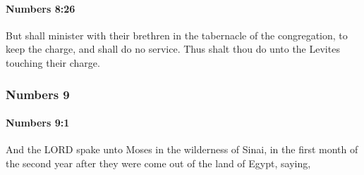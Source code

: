 		\paragraph{Numbers 8:26} %
			\label{NUMBERS-8-26}

			But shall minister with their brethren in the tabernacle of the congregation, to keep the charge, and shall do no service. Thus shalt thou do unto the Levites touching their charge.

	\subsubsection{Numbers 9} %
		\label{NUMBERS-9}

		\paragraph{Numbers 9:1} %
			\label{NUMBERS-9-1}

			And the LORD spake unto Moses in the wilderness of Sinai, in the first month of the second year after they were come out of the land of Egypt, saying,

